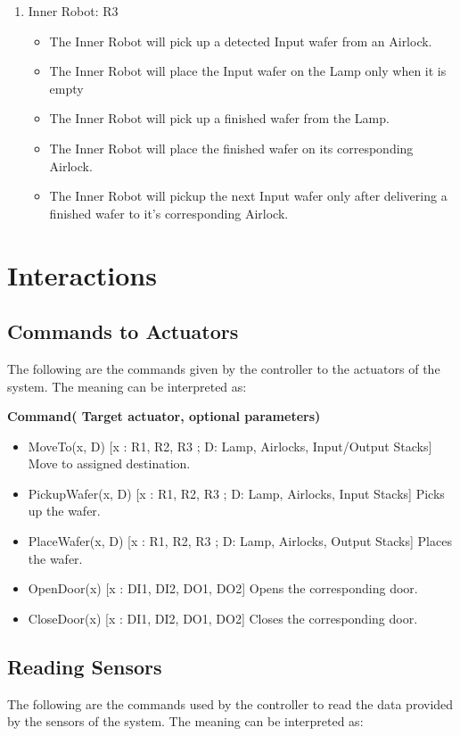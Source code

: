 \documentclass[a4paper,12pt]{article}
\begin{document}
\begin{enumerate}
\item Inner Robot: R3
	\begin{itemize}
	\item The Inner Robot will pick up a detected Input wafer from an Airlock.
	\item The Inner Robot will place the Input wafer on the Lamp only when it is empty
	\item The Inner Robot will pick up a finished wafer from the Lamp.
	\item The Inner Robot will place the finished wafer on its corresponding Airlock.
	\item The Inner Robot will pickup the next Input wafer only after delivering a finished wafer to it's corresponding Airlock.
	\end{itemize}

\end{enumerate}
\fi

\section{Interactions} 
\subsection {Commands to Actuators}
The following are the commands given by the controller to the actuators of the system. The meaning can be interpreted as: \bigskip

\textbf{Command( Target actuator, optional parameters)}
\begin{itemize}
\item MoveTo(x, D) [x : R1, R2, R3 ; D: Lamp, Airlocks, Input/Output Stacks]		Move to assigned destination.	
\item PickupWafer(x, D)															[x : R1, R2, R3 ; D: Lamp, Airlocks, Input Stacks] 					Picks up the wafer.
\item PlaceWafer(x, D) 															[x : R1, R2, R3 ; D: Lamp, Airlocks, Output Stacks]					Places the wafer.
\item OpenDoor(x) 																[x : DI1, DI2, DO1, DO2]  														Opens the corresponding door.
\item CloseDoor(x) 																[x : DI1, DI2, DO1, DO2]														Closes the corresponding door.

\end{itemize}
\bigskip
\subsection {Reading Sensors}
The following are the commands used by the controller to read the data provided by the sensors of the system. The meaning can be interpreted as: \bigskip
\end{document}
